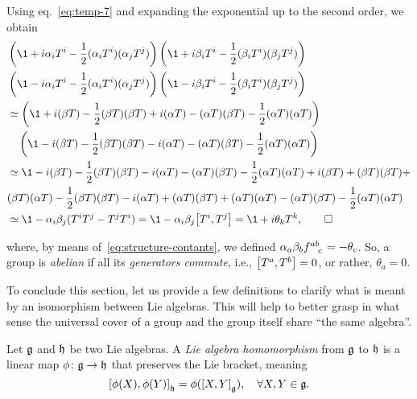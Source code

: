 \begin{mdframed}
\begin{innerproof}
    Using eq.~\eqref{eq:temp-7} and expanding the exponential up to the second order, we obtain
\begin{equation*}
\begin{split}
    &\left( \1 + i \alpha_i T^i - \frac{1}{2} (\alpha_i T^i) (\alpha_j T^j)\right)
    \left( \1 + i \beta_i T^i - \frac{1}{2} (\beta_i T^i) (\beta_j T^j)\right) \\
    &\left( \1 - i \alpha_i T^i - \frac{1}{2} (\alpha_i T^i) (\alpha_j T^j)\right)
    \left( \1 - i \beta_i T^i - \frac{1}{2} (\beta_i T^i) (\beta_j T^j)\right) \\
    &\simeq \left( \1 + i (\beta T) - \frac{1}{2}(\beta T) (\beta T) + i (\alpha T) - (\alpha T) (\beta T) - \frac{1}{2} (\alpha T)(\alpha T) \right) \\
    & \quad \left( \1 - i (\beta T) - \frac{1}{2}(\beta T) (\beta T) - i (\alpha T) - (\alpha T) (\beta T) - \frac{1}{2} (\alpha T)(\alpha T) \right) \\
    &\simeq \1 - i(\beta T) - \frac{1}{2} (\beta T) (\beta T) - i (\alpha T) - (\alpha T)(\beta T) - \frac{1}{2}(\alpha T)(\alpha T) + i (\beta T) + (\beta T)(\beta T) + \\ &(\beta T)(\alpha T) - \frac{1}{2} (\beta T)(\beta T) - i (\alpha T) + (\alpha T)(\beta T) + (\alpha T)(\alpha T) - (\alpha T)(\beta T) - \frac{1}{2}(\alpha T)(\alpha T) \\
    &\simeq \1 - \alpha_i \beta_j (T^i T^j - T^j T^i) = \1 - \alpha_i \beta_j \comm{T^i}{T^j} = \1 + i \theta_k T^k , \qedhere
\end{split}
\end{equation*}
\end{innerproof}
\end{mdframed}
where, by means of~\eqref{eq:structure-contants}, we defined $\alpha_a \beta_b \tensor{f}{^a^b_c} = -\theta_c$. So, a group is \emph{abelian} if all its \emph{generators commute}, i.e., $\comm{T^a}{T^b} = 0$, or rather, $\theta_a = 0$.

To conclude this section, let us provide a few definitions to clarify what is meant by an
isomorphism between Lie algebras. This will help to better grasp in what sense the universal cover of a group and the group itself share “the same algebra”.

\begin{definition}\label{def:algebra-homomorphism}
    Let $\mathfrak{g}$ and $\mathfrak{h}$ be two Lie algebras. A \emph{Lie algebra homomorphism} from $\mathfrak{g}$ to $\mathfrak{h}$ is a linear map $\phi \colon \mathfrak{g} \to \mathfrak{h}$ that preserves the Lie bracket, meaning
    \begin{equation}
        \comm{\phi(X)}{\phi(Y)}_\h = \phi(\comm{X}{Y}_\g), \quad \forall X,Y \in \g.
    \end{equation}
\end{definition}

